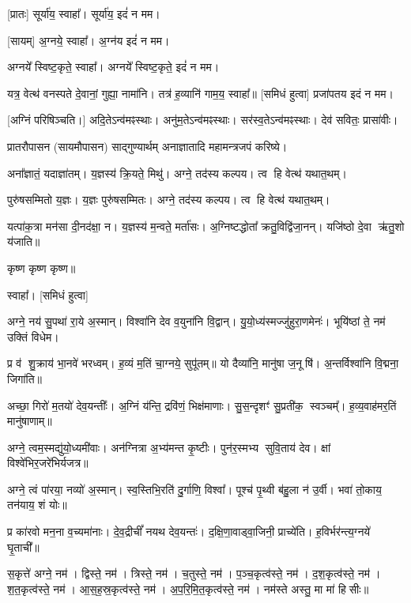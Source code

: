 [प्रातः] सूर्या॑य॒ स्वाहा᳚। सूर्या॑य॒ इदं॑ न मम।

[सायम्] अ॒ग्नये॒ स्वाहा᳚। अ॒ग्न॑य इदं॑ न मम।

अग्नये᳚ स्विष्ट॒कृते॒ स्वाहा᳚। अग्नये᳚ स्विष्ट॒कृते॒ इदं॑ न मम।


यत्र॒ वेत्थ॑ वनस्पते दे॒वानां॒ गुह्या॒ नामा॑नि। तत्र॑ ह॒व्यानि॑ गाम॒य॒ स्वाहा᳚॥ [समिधं हुत्वा]
प्रजा॑पतय इदं न मम।

[अग्निं परिषिञ्चति।]
अदि॒तेऽन्व॑मꣴस्थाः। अनु॑म॒तेऽन्व॑मꣴस्थाः। सर॑स्व॒तेऽन्व॑मꣴस्थाः। देव॑ सवितः॒ प्रासा॑वीः।


प्रातरौपासन (सायमौपासन) साद्गुण्यार्थम् अनाज्ञातादि महामन्त्रजपं करिष्ये।

अना᳚ज्ञातं॒ यदाज्ञा॑तम्। य॒ज्ञस्य॑ क्रि॒यते॒ मिथु॑।
अग्ने॒ तद॑स्य कल्पय। त्व हि वेत्थ॑ यथात॒थम्।

पुरु॑षसम्मितो य॒ज्ञः। य॒ज्ञः पुरु॑षसम्मितः।
अग्ने॒ तद॑स्य कल्पय। त्व हि वेत्थ॑ यथात॒थम्।

यत्पा॑क॒त्रा मन॑सा दी॒नद॑क्षा॒ न। य॒ज्ञस्य॑ म॒न्वते॒ मर्ता॑सः।
अ॒ग्निष्टद्धोता᳚ क्रतु॒विद्वि॑जा॒नन्। यजि॑ष्ठो दे॒वा ऋ॑तु॒शो य॑जाति॥

कृष्ण कृष्ण कृष्ण॥

स्वाहा᳚। [समिधं हुत्वा]


अग्ने॒ नय॑ सु॒पथा॑ रा॒ये अ॒स्मान्। विश्वा॑नि देव व॒युना॑नि वि॒द्वान्। यु॒यो॒ध्य॑स्मज्जु॑हुरा॒णमेनः॑। भूयि॑ष्ठां ते॒ नम॑ उक्तिं विधेम। 

प्र व॑ शु॒क्राय॑ भा॒नवे॑ भरध्वम्। ह॒व्यं म॒तिं चा॒ग्नये॒ सुपू॑तम्॥ यो दैव्या॑नि॒ मानु॑षा ज॒नूषि॑। अ॒न्तर्विश्वा॑नि वि॒द्मना॒ जिगा॑ति॥

अच्छा॒ गिरो॑ म॒तयो॑ देव॒यन्तीः᳚। अ॒ग्निं य॑न्ति॒ द्रवि॑णं॒ भिक्ष॑माणाः।
सु॒स॒न्दृशꣳ॑ सु॒प्रती॑क॒ स्वञ्चम्᳚। ह॒व्य॒वाह॑मर॒तिं मानु॑षाणाम्॥

अग्ने॒ त्वम॒स्मद्यु॑यो॒ध्यमी॑वाः। अन॑ग्नित्रा अ॒भ्य॑मन्त कृ॒ष्टीः।
पुन॑र॒स्मभ्य सुवि॒ताय॑ देव। क्षां विश्वे॑भिर॒जरे॑भिर्यजत्र॥ 

अग्ने॒ त्वं पा॑रया॒ नव्यो॑ अ॒स्मान्। स्व॒स्तिभि॒रति॑ दु॒र्गाणि॒ विश्वा᳚।
पूश्च॑ पृ॒थ्वी ब॑हु॒ला न॑ उ॒र्वी। भवा॑ तो॒काय॒ तन॑याय॒ शं योः॥

प्र का॑रवो मन॒ना व॒च्यमा॑नाः। दे॒व॒द्रीचीं᳚ नयथ देव॒यन्तः॑।
द॒क्षि॒णा॒वाड्वा॒जिनी॒ प्राच्ये॑ति। ह॒विर्भर॑न्त्य॒ग्नये॑ घृ॒ताची᳚॥

स॒कृत्ते॑ अग्ने॒ नम॑। द्विस्ते॒ नम॑। त्रिस्ते॒ नम॑। च॒तुस्ते॒ नम॑। प॒ञ्च॒कृत्व॑स्ते॒ नम॑। द॒श॒कृत्व॑स्ते॒ नम॑। श॒त॒कृत्व॑स्ते॒ नम॑। आ॒स॒ह॒स्र॒कृत्व॑स्ते॒ नम॑। अ॒प॒रि॒मि॒त॒कृत्व॑स्ते॒ नम॑। नम॑स्ते अस्तु॒ मा मा॑ हिसीः॥

